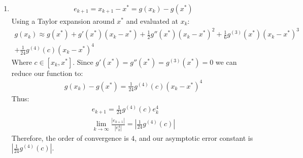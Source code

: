 \documentclass[12pt,letterpaper]{article}
\begin{document}
\begin{enumerate}
        \item
        \begin{gather*}
            e_{k+1} = x_{k+1} - x^* = g(x_k) - g(x^*)
        \end{gather*}
        Using a Taylor expansion around $x^*$ and evaluated at $x_k$: 
        \begin{gather*}
            g(x_k) \approx g(x^*) + g'(x^*)(x_k - x^*) + \frac{1}{2}g''(x^*)(x_k - x^*)^2 + \frac{1}{6}g^{(3)}(x^*)(x_k - x^*)^3 \\
            + \frac{1}{24}g^{(4)}(c)(x_k - x^*)^4
        \end{gather*}
        Where $c\in [x_k, x^*]$. Since $g'(x^*) = g''(x^*) = g^{(3)}(x^*) = 0$ we can 
        reduce our function to: 
        \begin{gather*}
            g(x_k) - g(x^*) = \frac{1}{24}g^{(4)}(c)(x_k - x^*)^4
        \end{gather*}
        Thus: 
        \begin{gather*}
            e_{k+1} = \frac{1}{24}g^{(4)}(c)e_k^4\\
            \lim_{k\rightarrow \infty} \frac{|e_{k+1}|}{|e_k^4|} = |\frac{1}{24}g^{(4)}(c)|
        \end{gather*}
        Therefore, the order of convergence is $4$, and our asymptotic error constant is 
        $|\frac{1}{24}g^{(4)}(c)|$. 
    \end{enumerate}
\end{document}
